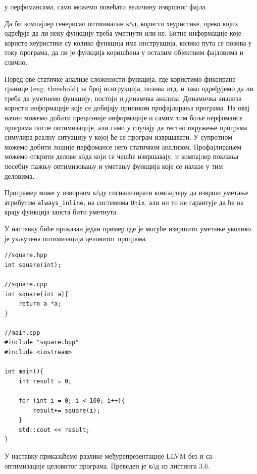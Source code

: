 \documentclass[12pt,oneside]{memoir}
\begin{document}
у перфомансама, само можемо повећати величину извршног фајла.
\par
Да би компајлер генерисао оптмималан к\^{o}д, користи хеуристике, преко којих одређује
да ли неку функцију треба уметнути или не.
Битне информације које користе хеуристике су колико функција има инструкција,
колико пута се позива у току програма, да ли је функција коришћена у осталим
објектним фајловима и слично.
\par
Поред ове статичке анализе сложености функција, где користимо фиксиране границе (eng. threshold)
за број иснтрукција, позива итд. и тако одређујемо да ли треба да уметнемо функцију,
постоји и динамчка анализа.
Динамичка анализа користи информације које се добијају приликом профајлирања програма.
На овај начин можемо добити прецизније информације и самим тим боље перфомансе програма после оптимизације,
али само у случају да тестно окружење програма симулира реалну ситуацију у којој
ће се програм извршавати.
У супротном можемо добити лошије перфомансе него статичком анализом.
Профајлирањем можемо открити делове к\^{o}да који се чешће извршавају, и компајлер 
поклања посебну пажњу оптимизовању и уметању функција које се налазе у тим деловима.

Програмер може у изворном  к\^{o}ду сигнализирати компајлеру да изврши уметање
атрибутом \texttt {always{\_}inline}, на системима \texttt{Unix}, али ни то не гарантује да ће на крају
функција заиста бити уметнута.
\par
У наставку биће приказан један пример где је могуће извршити уметање уколико
је укључена оптимизација целовитог програма.

\begin{lstlisting}[frame=single,caption={Primer umetanja funkcije}, captionpos=b]
//square.hpp           
int square(int);         
    					
//square.cpp				
int square(int a){
    return a *a;
}

//main.cpp
#include "square.hpp"
#include <iostream>

int main(){
    int result = 0;
    
    for (int i = 0; i < 100; i++){
        result+= square(i);
    }
    std::cout << result;
}

\end{lstlisting}

У наставку приказаћемо разлике међурепрезентације LLVM без и са оптимизације
целовитог програма. Преведен је к\^{o}д из листинга 3.6.
\end{document}
